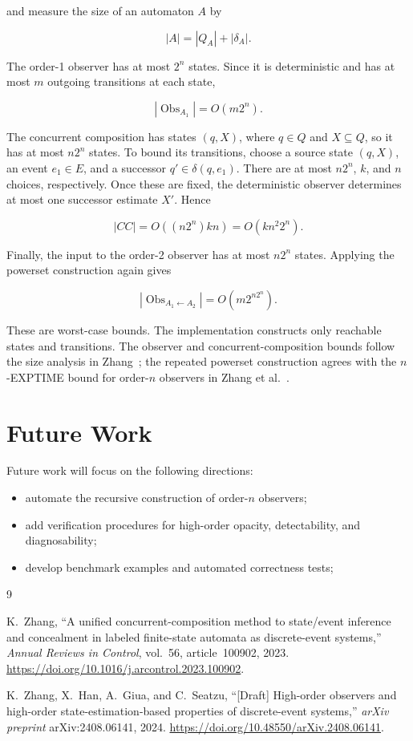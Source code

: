 \documentclass[11pt]{article}
\begin{document}
and measure the size of an automaton $A$ by

\[
|A|=|Q_A|+|\delta_A|.
\]

The order-1 observer has at most $2^n$ states. Since it is deterministic
and has at most $m$ outgoing transitions at each state,

\[
|\operatorname{Obs}_{A_1}|=O(m2^n).
\]

The concurrent composition has states $(q,X)$, where $q\in Q$ and
$X\subseteq Q$, so it has at most $n2^n$ states. To bound its transitions,
choose a source state $(q,X)$, an event $e_1\in E$, and a successor
$q'\in\delta(q,e_1)$. There are at most $n2^n$, $k$, and $n$ choices,
respectively. Once these are fixed, the deterministic observer determines
at most one successor estimate $X'$. Hence

\[
|CC|=O\!\left((n2^n)kn\right)
=O(kn^2 2^n).
\]

Finally, the input to the order-2 observer has at most $n2^n$ states.
Applying the powerset construction again gives

\[
|\operatorname{Obs}_{A_1\leftarrow A_2}|
=O\!\left(m2^{n2^n}\right).
\]

These are worst-case bounds. The implementation constructs only reachable
states and transitions. The observer and concurrent-composition bounds follow
the size analysis in Zhang~\cite{zhang2023concurrent}; the repeated powerset
construction agrees with the $n$-EXPTIME bound for order-$n$ observers in
Zhang et al.~\cite{zhang2024highorder}.

\section{Future Work}

Future work will focus on the following directions:

\begin{itemize}
\item automate the recursive construction of order-$n$ observers;
\item add verification procedures for high-order opacity, detectability, and diagnosability;
\item develop benchmark examples and automated correctness tests;
\end{itemize}


\begin{thebibliography}{9}

K.~Zhang,
``A unified concurrent-composition method to state/event inference and concealment in labeled finite-state automata as discrete-event systems,''
\emph{Annual Reviews in Control},
vol.~56, article~100902, 2023.
\url{https://doi.org/10.1016/j.arcontrol.2023.100902}.

K.~Zhang, X.~Han, A.~Giua, and C.~Seatzu,
``[Draft] High-order observers and high-order state-estimation-based properties of discrete-event systems,''
\emph{arXiv preprint} arXiv:2408.06141, 2024.
\url{https://doi.org/10.48550/arXiv.2408.06141}.

\end{thebibliography}
\end{document}
